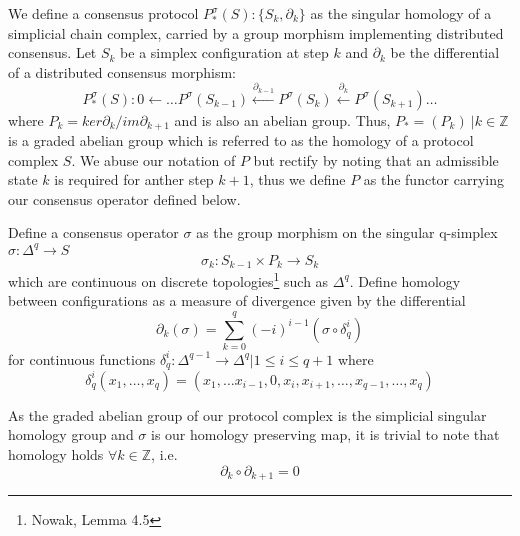 \documentclass{article}
\begin{document}
 
We define a consensus protocol $P^\sigma_{*}(S):\{S_k, \partial_k\}$ 
as the singular homology of a simplicial chain complex, carried by a group morphism implementing distributed consensus. Let $S_k$ be a simplex configuration at step $k$ and $\partial_k$ be the differential of a distributed consensus morphism:
\begin{equation} \label{eq1}
P^\sigma_{*}(S): 0 \leftarrow \dots P^\sigma(S_{k-1})\xleftarrow {\partial_{k-1}} P^\sigma(S_{k})\xleftarrow {\partial_{k}} P^\sigma(S_{k+1}) \dots 
\end{equation} \label{eq1}
where $P_k = ker \partial_k / im \partial_{k+1}$ and is also an abelian group. Thus, $P_*= (P_k) \ | k \in \mathbb{Z}$ is a graded abelian group which is referred to as the homology of a protocol complex $S$. We abuse our notation of $P$ but rectify by noting that an admissible state $k$ is required for anther step $k + 1$, thus we define $P$ as the functor carrying our consensus operator defined below.

Define a consensus operator $\sigma$ as the group morphism on the singular q-simplex $\sigma: \Delta^q \rightarrow S$ 
\begin{equation} \label{eq1}
\sigma_k: S_{k-1} \times P_k \rightarrow S_{k}
\end{equation} \label{eq1}
which are continuous on discrete topologies\footnote{Nowak, Lemma 4.5} such as $\Delta^q$. Define homology between configurations as a measure of divergence given by the differential 
\begin{equation} \label{eq1}
\partial_k(\sigma) = \sum^{q}_{k=0} (-i)^{i-1}(\sigma \circ \delta_q^{i} )
\end{equation} \label{eq1}
for continuous functions $\delta^{i}_q: \Delta^{q-1} \rightarrow \Delta^q | 1 \leq i \leq q+1$ where 
\begin{equation} \label{eq1}
\delta^{i}_q(x_1, \dots, x_q) = (x_1, \dots x_{i-1}, 0, x_i, x_{i+1}, \dots, x_{q-1}, \dots, x_q)
\end{equation} \label{eq1}

As the graded abelian group of our protocol complex is the simplicial singular homology group and $\sigma$ is our homology preserving map, it is trivial to note that homology holds $\forall k \in \mathbb{Z}$, i.e.
\begin{equation} \label{eq1}
\partial_k \circ \partial_{k+1} = 0
\end{equation} \label{eq1}
\end{document}

